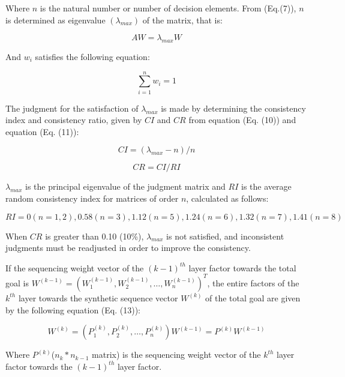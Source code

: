 \documentclass{mcmthesis}
\begin{document}
Where $n$ is the natural number or number of decision elements.
From (Eq.(7)), $n$ is determined as eigenvalue $(\lambda_{max})$ of the matrix, that is:

\begin{equation}\label{8}
AW=\lambda_{max}W
\end{equation}

And $w_i$ satisfies the following equation:

\begin{equation}\label{9}
\sum_{i=1}^{n}w_i=1
\end{equation}

The judgment for the satisfaction of $\lambda_{max}$ is made by determining the consistency index and consistency ratio, given by $CI$ and $CR$ from equation (Eq. (10)) and equation (Eq. (11)):

\begin{equation}\label{10}
CI=\left(\lambda_{max}-n\right)/n
\end{equation}

\begin{equation}\label{11}
CR=CI/RI
\end{equation}

$\lambda_{max}$ is the principal eigenvalue of the judgment matrix and $RI$
is the average random consistency index for matrices of order $n$, calculated as follows\cite{Wei2005An}:

\begin{equation}\label{12}
RI=0(n=1,2), 0.58(n=3), 1.12(n=5), 1.24(n=6), 1.32(n=7), 1.41(n=8)
\end{equation}

When $CR$ is greater than 0.10 (10\%), $\lambda_{max}$ is not satisfied,
and inconsistent judgments must be readjusted in order to improve the consistency.

If the sequencing weight vector of the $(k-1)^{th}$ layer factor towards the total goal is $W^{(k-1)}=\left(W_1^{(k-1)}, W_2^{(k-1)},\dots, W_n^{(k-1)}\right)^T$, the entire factors of the $k^{th}$ layer towards the synthetic sequence
vector $W^{(k)}$ of the total goal are given by the following equation (Eq. (13)):

\begin{equation}\label{13}
W^{(k)}=\left(P_1^{(k)},P_2^{(k)},\dots, P_n^{(k)}\right)W^{(k-1)}
=P^{(k)}W^{(k-1)}
\end{equation}

Where $P^{(k)}$($n_k*n_{k-1}$ matrix) is the sequencing weight vector
of the $k^{th}$ layer factor towards the $(k-1)^{th}$ layer factor.
\end{document}
